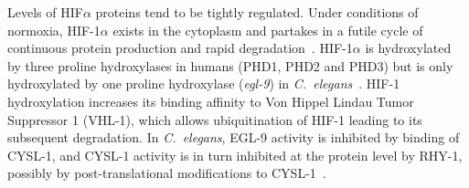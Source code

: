 \documentclass[9pt,twocolumn,twoside]{pnas-new}
\newcommand{\cel}{\emph{C.~elegans}}
\newcommand{\egl}{\emph{egl-9}}
\newcommand{\rhy}{\emph{rhy-1}}
\newcommand{\eglp}{EGL-9}
\newcommand{\rhyp}{RHY-1}
\newcommand{\vhlp}{VHL-1}
\newcommand{\hifp}{HIF-1}
\newcommand{\cyslp}{CYSL-1}
\begin{document}
Levels of HIF$\alpha$ proteins tend to be tightly regulated. Under conditions of
normoxia, \hifp{}$\alpha$ exists in the cytoplasm and partakes in a futile cycle
of continuous protein production and rapid degradation~\cite{Huang1996}.
\hifp{}$\alpha$ is hydroxylated by three proline hydroxylases
in humans (PHD1, PHD2 and PHD3) but is only hydroxylated by one proline
hydroxylase (\egl{}) in \cel{}~\cite{Kaelin2008}. \hifp{} hydroxylation increases its
binding affinity to Von Hippel Lindau Tumor Suppressor 1 (\vhlp{}), which allows
ubiquitination of \hifp{} leading to its subsequent degradation. In \cel{},
\eglp{} activity is inhibited by binding of \cyslp{}, and \cyslp{} activity is
in turn inhibited at the protein level by \rhyp{}, possibly by
post-translational modifications to \cyslp{}~\cite{Ma2012}.
\end{document}
